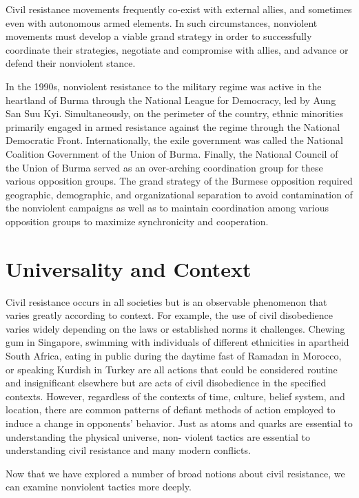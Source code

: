 \documentclass[twoside,a4paper,12pt,fleqn,openany]{extbook}
\begin{document}
Civil resistance movements frequently co-exist with external allies, and sometimes even with autonomous armed elements. In such circumstances, nonviolent movements must develop a viable grand strategy in order to successfully coordinate their strategies, negotiate and compromise with allies, and advance or defend their nonviolent stance.

In the 1990s, nonviolent resistance to the military regime was active in the heartland of Burma through the National League for Democracy, led by Aung San Suu Kyi. Simultaneously, on the perimeter of the country, ethnic minorities primarily engaged in armed resistance against the regime through the National Democratic Front. Internationally, the exile government was called the National Coalition Government of the Union of Burma. Finally, the National Council of the Union of Burma served as an over-arching coordination group for these various opposition groups. The grand strategy of the Burmese opposition required geographic, demographic, and organizational separation to avoid contamination of the nonviolent campaigns as well as to maintain coordination among various opposition groups to maximize synchronicity and cooperation.

\section*{Universality and Context}

Civil resistance occurs in all societies but is an observable phenomenon that varies greatly according to context. For example, the use of civil disobedience varies widely depending on the laws or established norms it challenges. Chewing gum in Singapore, swimming with individuals of different ethnicities in apartheid South Africa, eating in public during the daytime fast of Ramadan in Morocco, or speaking Kurdish in Turkey are all actions that could be considered routine and insignificant elsewhere but are acts of civil disobedience in the specified contexts. However, regardless of the contexts of time, culture, belief system, and location, there are common patterns of defiant methods of action employed to induce a change in opponents’ behavior. Just as atoms and quarks are essential to understanding the physical universe, non-
violent tactics are essential to understanding civil resistance and many modern conflicts.

Now that we have explored a number of broad notions about civil resistance, we can examine nonviolent tactics more deeply.
\end{document}
